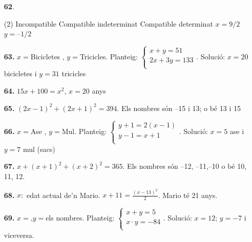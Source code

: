 \documentclass[a4paper, pdf, twoside]{book}
\begin{document}
\begin{multicols}{2}
\begin{enumerate}
 \item[\fontfamily{phv}\selectfont\color{blue}\textbf{62}. ] 
 \begin{tasks}[column-sep=1em, item-indent=1.3333em](2)
	 \task Incompatible
	 \task Compatible indeterminat
	 \task* Compatible determinat $x = 9/2$
	 \task $y = –1/2$
\end{tasks}
\vspace{0.25cm}
\item[\fontfamily{phv}\selectfont\color{blue}\textbf{63. }] 
$x=$Bicicletes , $y=$Tricicles. Planteig: $\left \{\begin {array}{l} x+y=51\\ 2x+3y=133\\ \end {array} \right .$. Solució: $x=20$ bicicletes i $y=31$ tricicles 
\vspace{0.25cm}
\item[\fontfamily{phv}\selectfont\color{blue}\textbf{64. }] 
$15x+100=x^2$, $x=20$ anys
\vspace{0.25cm}
\item[\fontfamily{phv}\selectfont\color{blue}\textbf{65. }] 
$(2x-1)^2+(2x+1)^2=394$. Els nombres són --15 i 13; o bé 13 i 15
\vspace{0.25cm}
\item[\fontfamily{phv}\selectfont\color{blue}\textbf{66. }] 
$x=$Ase , $y=$Mul. Planteig: $\left \{\begin {array}{l} y+1=2(x-1)\\ y-1=x+1\\ \end {array} \right .$. Solució: $x=5$ ase i $y=7$ mul (sacs) 
\vspace{0.25cm}
\item[\fontfamily{phv}\selectfont\color{blue}\textbf{67. }] 
$x+(x+1)^2+(x+2)^2=365$. Els nombres són --12, --11,--10 o bé 10, 11, 12.
\vspace{0.25cm}
\item[\fontfamily{phv}\selectfont\color{blue}\textbf{68. }] 
$x:$ edat actual de'n Mario. $x+11=\frac {(x-13)^2}{2}$. Mario té 21 anys.
\vspace{0.25cm}
\item[\fontfamily{phv}\selectfont\color{blue}\textbf{69. }] 
$x=$,$y=$els nombres. Planteig: $\left \{\begin {array}{l} x+y=5\\ x\cdot y=-84\\ \end {array} \right .$. Solució: $x=12$; $y=-7$ i viceversa.

\end{enumerate}
\end{multicols}
\end{document}
